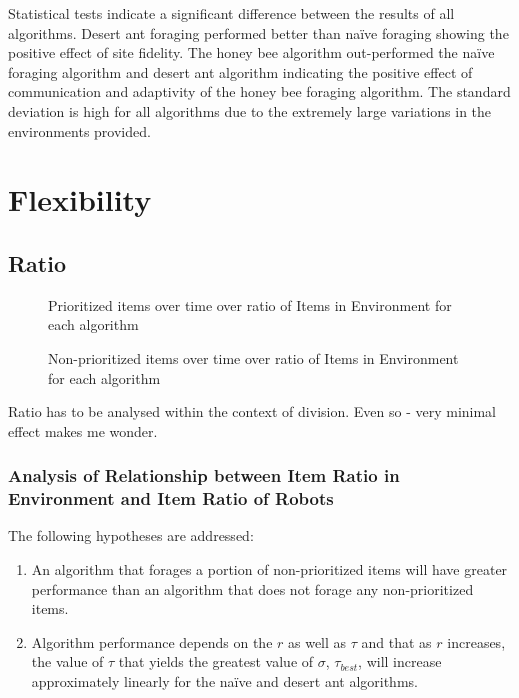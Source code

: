 Statistical tests indicate a significant difference between the results of all algorithms. Desert ant foraging performed better than na\"ive foraging showing the positive effect of site fidelity. The honey bee algorithm out-performed the na\"ive foraging algorithm and desert ant algorithm indicating the positive effect of communication and adaptivity of the honey bee foraging algorithm. The standard deviation is high for all algorithms due to the extremely large variations in the environments provided.


\section{Flexibility}
\label{results:flexibility}


\subsection{Ratio}
\label{results:ratio}


\begin{figure}[!htb]
\centering
\resizebox{\textwidth}{!}{}
\caption{Prioritized items over time over ratio of Items in Environment for each algorithm }
\label{ratiogoldplot}
\end{figure}


\begin{figure}[!htb]
\centering
\resizebox{\textwidth}{!}{}
\caption{Non-prioritized items over time over ratio of Items in Environment for each algorithm}
\label{ratiowasteplot}
\end{figure}

Ratio has to be analysed within the context of division. Even so - very minimal effect makes me wonder. 

\subsubsection{Analysis of Relationship between Item Ratio in Environment and Item Ratio of Robots}
\label{relationship}

The following hypotheses are addressed:
\begin{enumerate}
\item An algorithm that forages a portion of non-prioritized items will have greater performance than an algorithm that does not forage any non-prioritized items.
\item Algorithm performance depends on the $r$ as well as $\tau$ and that as $r$ increases, the value of $\tau$ that yields the greatest value of $\sigma$, $\tau_{best}$, will increase approximately linearly for the na\"ive and desert ant algorithms.
\end{enumerate}

